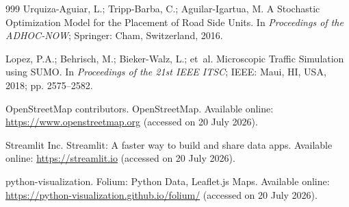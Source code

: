 \documentclass[smartcities,article,submit,oneauthor]{Definitions/mdpi}
\begin{document}

\begin{thebibliography}{999}
Urquiza-Aguiar, L.; Tripp-Barba, C.; Aguilar-Igartua, M. A Stochastic Optimization
Model for the Placement of Road Side Units. In {\em Proceedings of the ADHOC-NOW};
Springer: Cham, Switzerland, 2016.

Lopez, P.A.; Behrisch, M.; Bieker-Walz, L.; et~al. Microscopic Traffic Simulation
using SUMO. In {\em Proceedings of the 21st IEEE ITSC}; IEEE: Maui, HI, USA, 2018;
pp. 2575--2582.

OpenStreetMap contributors. OpenStreetMap. Available online:
\url{https://www.openstreetmap.org} (accessed on 20 July 2026).

Streamlit Inc. Streamlit: A faster way to build and share data apps. Available
online: \url{https://streamlit.io} (accessed on 20 July 2026).

python-visualization. Folium: Python Data, Leaflet.js Maps. Available online:
\url{https://python-visualization.github.io/folium/} (accessed on 20 July 2026).
\end{thebibliography}

\PublishersNote{}
\end{document}
